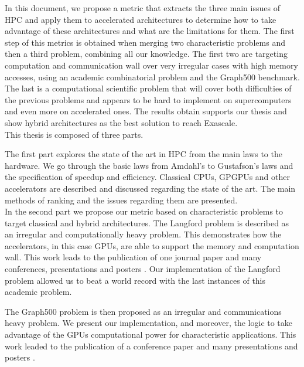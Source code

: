 In this document, we propose a metric that extracts the three main issues of HPC and apply them to accelerated architectures to determine how to take advantage of these architectures and what are the limitations for them. 
The first step of this metrics is obtained when merging two characteristic problems and then a third problem, combining all our knowledge.
The first two are targeting computation and communication wall over very irregular cases with high memory accesses, using an academic combinatorial problem and the Graph500 benchmark. 
The last is a computational scientific problem that will cover both difficulties of the previous problems and appears to be hard to implement on supercomputers and even more on accelerated ones.
The results obtain supports our thesis and show hybrid architectures as the best solution to reach Exascale.\\

This thesis is composed of three parts.

The first part explores the state of the art in HPC from the main laws to the hardware. 	
We go through the basic laws from Amdahl's to Gustafson's laws and the specification of speedup and efficiency.
Classical CPUs, GPGPUs and other accelerators are described and discussed regarding the state of the art. 
The main methods of ranking and the issues regarding them are presented.\\ 

In the second part we propose our metric based on characteristic problems to target classical and hybrid architectures.
The Langford problem is described as an irregular and computationally heavy problem.
This demonstrates how the accelerators, in this case GPUs, are able to support the memory and computation wall. 
This work leads to the publication of one journal paper \cite{krajecki2016many} and many conferences, presentations and posters \cite{deleau2014towards,j2016resolution,jaillet2014Langford}.
Our implementation of the Langford problem allowed us to beat a world record with the last instances of this academic problem.

The Graph500 problem is then proposed as an irregular and communications heavy problem. 
We present our implementation, and moreover, the logic to take advantage of the GPUs computational power for characteristic applications. 
This work leaded to the publication of a conference paper \cite{krajecki2016bfs} and many presentations and posters \cite{loiseau2015parcours,loiseau2015GTC}.\\


